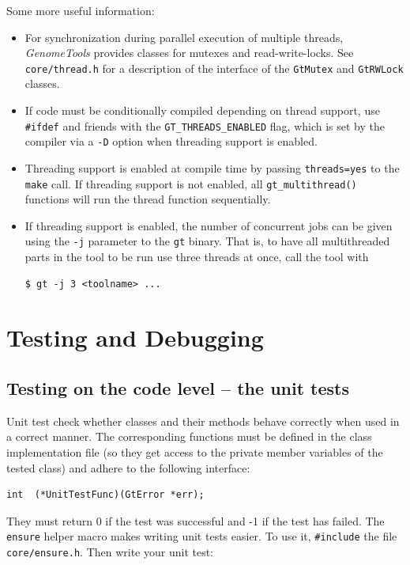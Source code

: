 \documentclass[11pt,final]{article}
\newcommand{\keyword}[1]{\lstinline{#1}}
\newcommand{\Gt}[0]{\emph{GenomeTools}\xspace}
\begin{document}
Some more useful information:
\begin{itemize}
\item
For synchronization during parallel execution of multiple threads, \Gt provides
classes for mutexes and read-write-locks. See \keyword{core/thread.h} for a
description of the interface of the \keyword{GtMutex} and \keyword{GtRWLock}
classes.
\item
If code must be conditionally compiled depending on thread support, use
\keyword{#ifdef} and friends with the \keyword{GT_THREADS_ENABLED} flag, which
is set by the compiler via a \keyword{-D} option when threading support is
enabled.
\item
Threading support is enabled at compile time by passing \keyword{threads=yes} to
the \keyword{make} call. If threading support is not enabled, all
\keyword{gt_multithread()} functions will run the thread function sequentially.
\item
If threading support is enabled, the number of concurrent jobs can be given
using the \keyword{-j} parameter to the \keyword{gt} binary. That is, to have
all multithreaded parts in the tool to be run use three threads at once, call
the tool with

\begin{lstlisting}
$ gt -j 3 <toolname> ...
\end{lstlisting}%

\end{itemize}


\section{Testing and Debugging}
\subsection{Testing on the code level -- the unit tests}
\label{unittests}

Unit test check whether classes and their methods behave correctly when used in
a correct manner. The corresponding functions must be defined in the class
implementation file (so they get access to the private member variables of the
tested class) and adhere to the following interface:

\begin{lstlisting}
int  (*UnitTestFunc)(GtError *err);
\end{lstlisting}

They must return 0 if the test was successful and -1 if the test has failed.
The \keyword{ensure} helper macro makes writing unit tests easier. To use it,
\keyword{#include} the file \keyword{core/ensure.h}. Then write your unit test:
\end{document}
